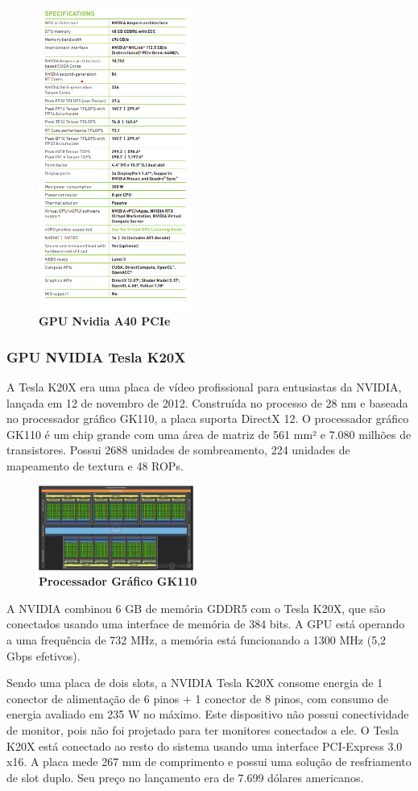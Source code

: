 \documentclass[conference]{IEEEtran}
\begin{document}
\begin{figure}[h]
\centerline{\includegraphics[width = 2.0in]{dataa40.png}}
\caption{\textbf{GPU Nvidia A40 PCIe}}
\label{figAM9300}
\end{figure}

\subsubsection{GPU NVIDIA Tesla K20X}
\par A Tesla K20X era uma placa de vídeo profissional para entusiastas da NVIDIA, lançada em 12 de novembro de 2012. Construída no processo de 28 nm e baseada no processador gráfico GK110, a placa suporta DirectX 12. O processador gráfico GK110 é um chip grande com uma área de matriz de 561 mm² e 7.080 milhões de transistores. Possui 2688 unidades de sombreamento, 224 unidades de mapeamento de textura e 48 ROPs.

\begin{figure}[h]
\centerline{\includegraphics[width = 2.0in]{nvidia gk110.jpg}}
\caption{\textbf{Processador Gráfico GK110}}
\label{figAM9300}
\end{figure}

\par A NVIDIA combinou 6 GB de memória GDDR5 com o Tesla K20X, que são conectados usando uma interface de memória de 384 bits. A GPU está operando a uma frequência de 732 MHz, a memória está funcionando a 1300 MHz (5,2 Gbps efetivos).
\par Sendo uma placa de dois slots, a NVIDIA Tesla K20X consome energia de 1 conector de alimentação de 6 pinos + 1 conector de 8 pinos, com consumo de energia avaliado em 235 W no máximo. Este dispositivo não possui conectividade de monitor, pois não foi projetado para ter monitores conectados a ele. O Tesla K20X está conectado ao resto do sistema usando uma interface PCI-Express 3.0 x16. A placa mede 267 mm de comprimento e possui uma solução de resfriamento de slot duplo. Seu preço no lançamento era de 7.699 dólares americanos.
\end{document}
